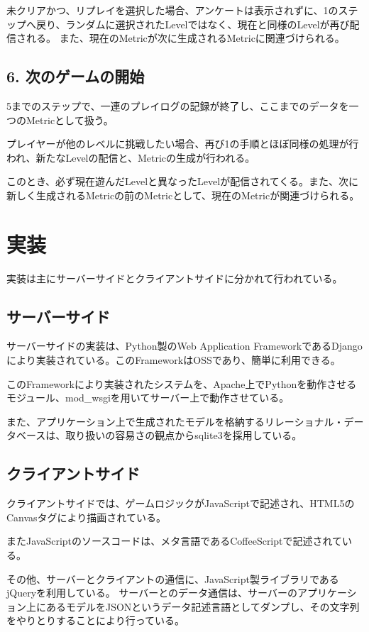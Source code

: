 未クリアかつ、リプレイを選択した場合、アンケートは表示されずに、1のステップへ戻り、ランダムに選択されたLevelではなく、現在と同様のLevelが再び配信される。
また、現在のMetricが次に生成されるMetricに関連づけられる。

\subsection{6. 次のゲームの開始}
5までのステップで、一連のプレイログの記録が終了し、ここまでのデータを一つのMetricとして扱う。

プレイヤーが他のレベルに挑戦したい場合、再び1の手順とほぼ同様の処理が行われ、新たなLevelの配信と、Metricの生成が行われる。

このとき、必ず現在遊んだLevelと異なったLevelが配信されてくる。また、次に新しく生成されるMetricの前のMetricとして、現在のMetricが関連づけられる。


\section{実装}
実装は主にサーバーサイドとクライアントサイドに分かれて行われている。

\subsection{サーバーサイド}
サーバーサイドの実装は、Python製のWeb Application FrameworkであるDjangoにより実装されている。このFrameworkはOSSであり、簡単に利用できる。

このFrameworkにより実装されたシステムを、Apache上でPythonを動作させるモジュール、mod\_wsgiを用いてサーバー上で動作させている。

また、アプリケーション上で生成されたモデルを格納するリレーショナル・データベースは、取り扱いの容易さの観点からsqlite3を採用している。

\subsection{クライアントサイド}
クライアントサイドでは、ゲームロジックがJavaScriptで記述され、HTML5のCanvasタグにより描画されている。

またJavaScriptのソースコードは、メタ言語であるCoffeeScriptで記述されている。

その他、サーバーとクライアントの通信に、JavaScript製ライブラリであるjQueryを利用している。
サーバーとのデータ通信は、サーバーのアプリケーション上にあるモデルをJSONというデータ記述言語としてダンプし、その文字列をやりとりすることにより行っている。
